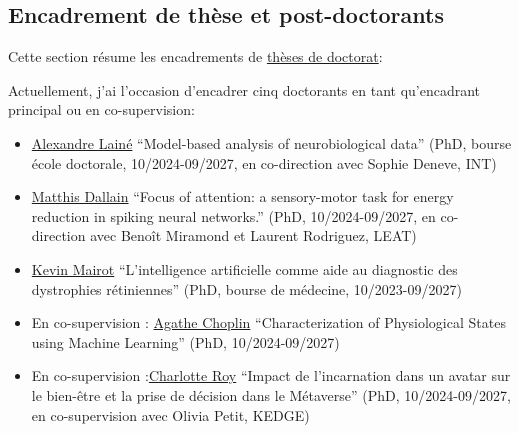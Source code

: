 \documentclass[10pt,french,a4paper,twoside]{article}%
\begin{document}
\subsection{Encadrement de thèse et post-doctorants} %

Cette section résume les encadrements de \href{https://www.theses.fr/074493701}{thèses de doctorat}:

Actuellement, j'ai l'occasion d'encadrer cinq doctorants %
en tant qu'encadrant principal ou en co-supervision:

\begin{itemize}
	\item \href{https://laurentperrinet.github.io/author/alexandre-lain%C3%A9/}{Alexandre Lainé} ``Model-based analysis of neurobiological data'' (PhD, bourse école doctorale, 10/2024-09/2027, en co-direction avec Sophie Deneve, INT)
	\item \href{https://laurentperrinet.github.io/author/matthis-dallain/}{Matthis Dallain} ``Focus of attention: a sensory-motor task for energy reduction in spiking neural networks.'' (PhD, 10/2024-09/2027, en co-direction avec Benoît Miramond et Laurent Rodriguez, LEAT)
	\item \href{https://laurentperrinet.github.io/author/kevin-mairot/}{Kevin Mairot} ``L’intelligence artificielle comme aide au diagnostic des dystrophies rétiniennes'' (PhD, bourse de médecine, 10/2023-09/2027)
	\item En co-supervision : \href{https://laurentperrinet.github.io/author/agathe-choplin/}{Agathe Choplin} ``Characterization of Physiological States using Machine Learning'' (PhD, 10/2024-09/2027)
	\item En co-supervision :\href{https://laurentperrinet.github.io/author/charlotte-roy/}{Charlotte Roy} ``Impact de l'incarnation dans un avatar sur le bien-être et la prise de décision dans le Métaverse'' (PhD, 10/2024-09/2027, en co-supervision avec Olivia Petit, KEDGE)
\end{itemize}
\end{document}
